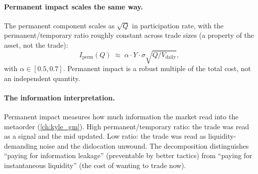\paragraph{Permanent impact scales the same way.}
The permanent component scales as $\sqrt{Q}$ in participation rate,
with the permanent/temporary ratio roughly constant across trade
sizes (a property of the asset, not the trade):
\[
  I_{\text{perm}}(Q) \;\approx\; \alpha \cdot Y \cdot \sigma \sqrt{Q / V_{\text{daily}}},
\]
with $\alpha \in [0.5, 0.7]$. Permanent impact is a robust multiple
of the total cost, not an independent quantity.

\paragraph{The information interpretation.}
Permanent impact measures how much information the market read into
the metaorder (\cref{ch:kyle_gm}). High permanent/temporary ratio:
the trade was read as a signal and the mid updated. Low ratio: the
trade was read as liquidity-demanding noise and the dislocation
unwound. The decomposition distinguishes ``paying for information
leakage'' (preventable by better tactics) from ``paying for
instantaneous liquidity'' (the cost of wanting to trade now).

